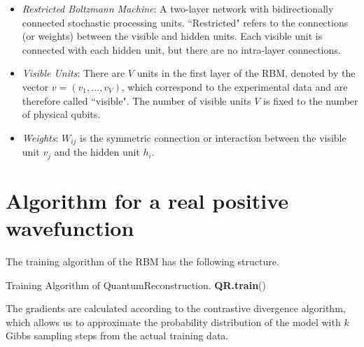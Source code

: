 \documentclass[submission, Phys]{SciPost}
\begin{document}
\begin{itemize}
	\item {\it Restricted Boltzmann Machine}: A two-layer network with bidirectionally connected stochastic processing units. ``Restricted" refers to the connections (or weights) between the visible and hidden units. Each visible unit is connected with each hidden unit, but there are no intra-layer connections.

	\item {\it Visible Units}: There are $V$ units in the first layer of the RBM, denoted by the vector $v=(v_1, ..., v_V)$, which correspond to the experimental data and are therefore called ``visible". The number of visible units $V$ is fixed to the number of physical qubits.

	\item {\it Weights}: $W_{ij}$ is the symmetric connection or interaction between the visible unit $v_j$ and the hidden unit $h_i$.

\end{itemize}



	\section{Algorithm for a real positive wavefunction}
	The training algorithm of the RBM has the following structure.

	\begin{algorithm}[H]
		\caption{Training Algorithm of QuantumReconstruction. \textbf{QR.train}() }
		\SetAlgoLined

	\end{algorithm}


	The gradients are calculated according to the contrastive divergence algorithm, which allows us to approximate the probability distribution of the model with $k$ Gibbs sampling steps from the actual training data.
\end{document}
